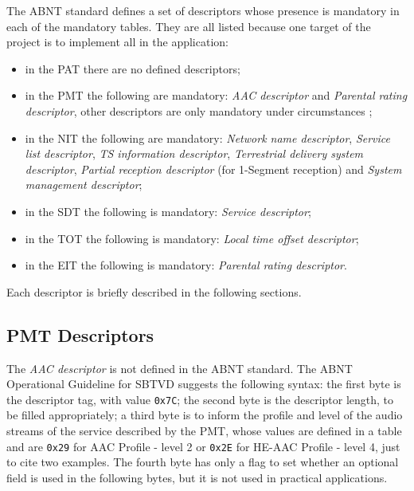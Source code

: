 \documentclass[
	12pt,				%
	openright,			%
	twoside,			%
	a4paper,			%
	brazil,
	french,				%
	english
	]{abntex2}
\begin{document}
The ABNT standard defines a set of descriptors whose presence is mandatory in each of the mandatory tables. They are all listed because one target of the project is to implement all in the application:

\begin{itemize}

\item in the PAT there are no defined descriptors;
\item in the PMT the following are mandatory: \textit{AAC descriptor} and \textit{Parental rating descriptor}, other descriptors are only mandatory under circumstances ;
\item in the NIT the following are mandatory: \textit{Network name descriptor}, \textit{Service list descriptor}, \textit{TS information descriptor}, \textit{Terrestrial delivery system descriptor}, \textit{Partial reception descriptor} (for 1-Segment reception) and \textit{System management descriptor};
\item in the SDT the following is mandatory: \textit{Service descriptor};
\item in the TOT the following is mandatory: \textit{Local time offset descriptor};
\item in the EIT the following is mandatory: \textit{Parental rating descriptor}.
\end{itemize}

Each descriptor is briefly described in the following sections.

\subsection{PMT Descriptors}
\label{pmt_descriptors}
The \textit{AAC descriptor} is not defined in the ABNT standard. The ABNT Operational Guideline for SBTVD suggests the following syntax: the first byte is the descriptor tag, with value \texttt{0x7C}; the second byte is the descriptor length, to be filled appropriately; a third byte is to inform the profile and level of the audio streams of the service described by the PMT, whose values are defined in a table\cite{guia} and are \texttt{0x29} for AAC Profile - level 2 or \texttt{0x2E} for HE-AAC Profile - level 4, just to cite two examples. The fourth byte has only a flag to set whether an optional field is used in the following bytes, but it is not used in practical applications.
\end{document}
